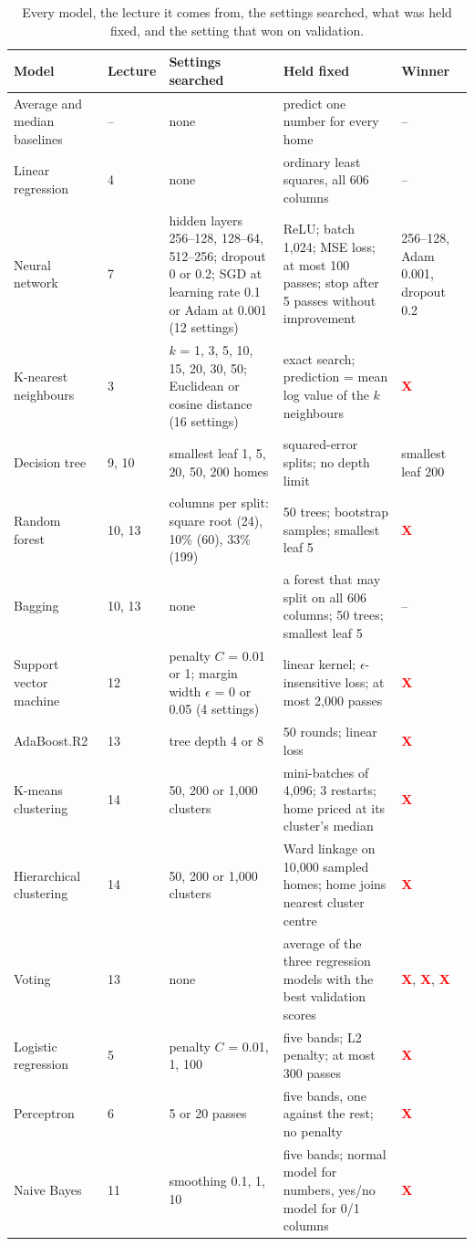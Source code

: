\documentclass[sigconf,nonacm,10pt]{acmart}
\newcommand{\X}{\textcolor{red}{\textbf{X}}}
\begin{document}
\begin{table}[t]
\caption{Every model, the lecture it comes from, the settings searched, what was held fixed, and the setting that won on validation.}
\label{tab:grids}
\small
\renewcommand{\arraystretch}{1.15}
\begin{tabularx}{\textwidth}{@{}L{2.6cm}L{0.9cm}YYL{3.1cm}@{}}
\toprule
Model & Lecture & Settings searched & Held fixed & Winner \\
\midrule
Average and median baselines & -- & none & predict one number for every home & -- \\
Linear regression & 4 & none & ordinary least squares, all 606 columns & -- \\
Neural network & 7 & hidden layers 256--128, 128--64, 512--256; dropout 0 or 0.2; SGD at learning rate 0.1 or Adam at 0.001 (12 settings) & ReLU; batch 1,024; MSE loss; at most 100 passes; stop after 5 passes without improvement & 256--128, Adam 0.001, dropout 0.2 \\
K-nearest neighbours & 3 & $k$ = 1, 3, 5, 10, 15, 20, 30, 50; Euclidean or cosine distance (16 settings) & exact search; prediction = mean log value of the $k$ neighbours & \X \\
Decision tree & 9, 10 & smallest leaf 1, 5, 20, 50, 200 homes & squared-error splits; no depth limit & smallest leaf 200 \\
Random forest & 10, 13 & columns per split: square root (24), 10\% (60), 33\% (199) & 50 trees; bootstrap samples; smallest leaf 5 & \X \\
Bagging & 10, 13 & none & a forest that may split on all 606 columns; 50 trees; smallest leaf 5 & -- \\
Support vector machine & 12 & penalty $C$ = 0.01 or 1; margin width $\epsilon$ = 0 or 0.05 (4 settings) & linear kernel; $\epsilon$-insensitive loss; at most 2,000 passes & \X \\
AdaBoost.R2 & 13 & tree depth 4 or 8 & 50 rounds; linear loss & \X \\
K-means clustering & 14 & 50, 200 or 1,000 clusters & mini-batches of 4,096; 3 restarts; home priced at its cluster's median & \X \\
Hierarchical clustering & 14 & 50, 200 or 1,000 clusters & Ward linkage on 10,000 sampled homes; home joins nearest cluster centre & \X \\
Voting & 13 & none & average of the three regression models with the best validation scores & \X, \X, \X \\
Logistic regression & 5 & penalty $C$ = 0.01, 1, 100 & five bands; L2 penalty; at most 300 passes & \X \\
Perceptron & 6 & 5 or 20 passes & five bands, one against the rest; no penalty & \X \\
Naive Bayes & 11 & smoothing 0.1, 1, 10 & five bands; normal model for numbers, yes/no model for 0/1 columns & \X \\
\bottomrule
\end{tabularx}
\end{table}
\end{document}
